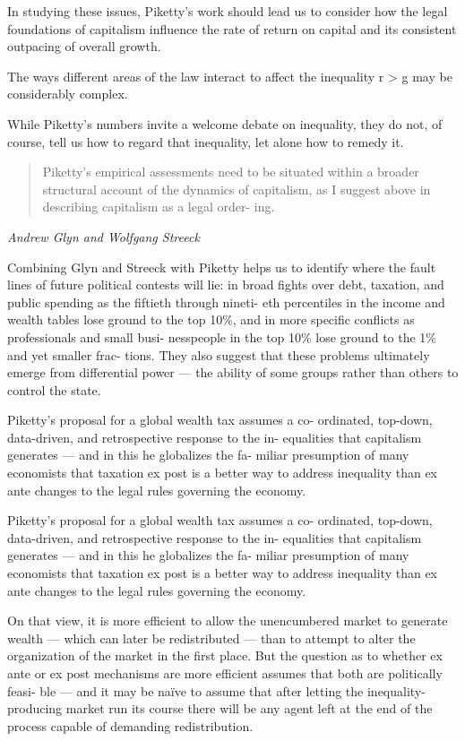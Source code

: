 \documentclass[
]{book}
\begin{document}
In studying these issues, Piketty's work should lead us to consider
how the legal foundations of capitalism influence the rate of return on
capital and its consistent outpacing of overall growth.

The ways different areas of the law interact to affect the inequality r \textgreater{} g may be
considerably complex.

While Piketty's numbers invite a welcome debate on inequality, they do not,
of course, tell us how to regard that inequality, let alone how to
remedy it.

\begin{quote}
Piketty's empirical assessments need
to be situated within a broader structural account of the dynamics of
capitalism, as I suggest above in describing capitalism as a legal order-
ing.
\end{quote}

\emph{Andrew Glyn and Wolfgang Streeck}

Combining Glyn and Streeck with Piketty helps us to identify
where the fault lines of future political contests will lie: in broad fights
over debt, taxation, and public spending as the fiftieth through nineti-
eth percentiles in the income and wealth tables lose ground to the top
10\%, and in more specific conflicts as professionals and small busi-
nesspeople in the top 10\% lose ground to the 1\% and yet smaller frac-
tions. They also suggest that these problems ultimately emerge from
differential power --- the ability of some groups rather than others to
control the state.

Piketty's proposal for a global wealth tax assumes a co-
ordinated, top-down, data-driven, and retrospective response to the in-
equalities that capitalism generates --- and in this he globalizes the fa-
miliar presumption of many economists that taxation ex post is a
better way to address inequality than ex ante changes to the legal rules
governing the economy.

Piketty's proposal for a global wealth tax assumes a co-
ordinated, top-down, data-driven, and retrospective response to the in-
equalities that capitalism generates --- and in this he globalizes the fa-
miliar presumption of many economists that taxation ex post is a
better way to address inequality than ex ante changes to the legal rules
governing the economy.

On that view, it is more efficient to allow
the unencumbered market to generate wealth --- which can later be
redistributed --- than to attempt to alter the organization of the market
in the first place. But the question as to whether ex ante or ex post
mechanisms are more efficient assumes that both are politically feasi-
ble --- and it may be naïve to assume that after letting the inequality-
producing market run its course there will be any agent left at the end
of the process capable of demanding redistribution.
\end{document}
